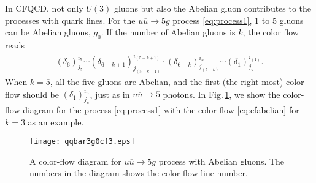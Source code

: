 \documentclass[a4paper,11pt]{article}
\begin{document}
In CFQCD, not only $U(3)$ gluons but also the Abelian gluon
contributes to the processes with quark lines. For the
$u\overline{u}\rightarrow 5g$ process \eqref{eq:process1}, 1 to 5
gluons can be Abelian gluons, $g_0$. If the number of Abelian
gluons is $k$, the color flow reads
\begin{align}
 (\delta_6)_{j_5}^{i_5}\cdots
 (\delta_{6-k+1})_{j_{(5-k+1)}}^{i_{(5-k+1)}}\cdot
 (\delta_{6-k})_{j_{(5-k)}}^{i_u}\cdots (\delta_1)_{j_u}^{i_{(1)}}.
 \label{eq:cfabelian}
\end{align}
When $k=5$, all the five gluons are Abelian, and the first (the right-most)
color flow should be $(\delta_1)_{j_u}^{i_u}$, just as in
$u\overline{u}\rightarrow 5$ photons. In Fig.\,\ref{fig:qqbar3g0cf}, we
show the color-flow diagram for the process \eqref{eq:process1} with
the color flow \eqref{eq:cfabelian} for $k=3$ as an
 example.
\begin{figure}
\begin{center}
\texttt{[image: qqbar3g0cf3.eps]}
\caption{A color-flow diagram for $u\overline{u}\rightarrow
 5g$ process with Abelian gluons. The numbers in the diagram shows
 the
 color-flow-line number.}
\label{fig:qqbar3g0cf}
\end{center}
\end{figure}
\end{document}
